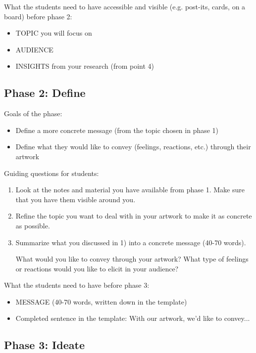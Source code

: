 \documentclass[12pt]{article}
\newcounter{question}
\begin{document}
What the students need to have accessible and visible (e.g. post-its, cards, on a board) before phase 2:

\begin{itemize}

\item TOPIC you will focus on
\item AUDIENCE
\item INSIGHTS from your research (from point 4)

\end{itemize}

\subsection{Phase 2: Define}

Goals of the phase: 
\begin{itemize}
\item Define a more concrete message (from the topic chosen in phase 1)
\item Define what they would like to convey (feelings, reactions, etc.) through their artwork
\end{itemize}


Guiding questions for students: 

\begin{enumerate}
\item Look at the notes and material you have available from phase 1. Make sure that you have them visible around you. \item Refine the topic you want to deal with in your artwork to make it as concrete as possible.
\item Summarize what you discussed in 1) into a concrete message (40-70 words). 

What would you like to convey through your artwork? What type of feelings or reactions would you like to elicit in your audience?
\end{enumerate}

What the students need to have before phase 3:

\begin{itemize}
\item MESSAGE (40-70 words, written down in the template)

\item Completed sentence in the template: With our artwork, we’d like to convey...
\end{itemize}

\subsection{Phase 3: Ideate}
\end{document}
